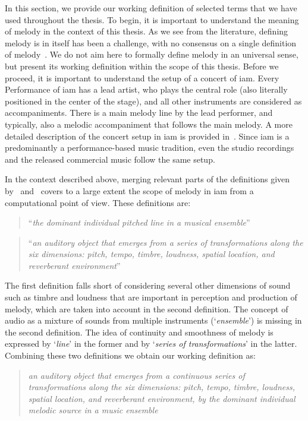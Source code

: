 In this section, we provide our working definition of selected terms that we have used throughout the thesis. To begin, it is important to understand the meaning of melody in the context of this thesis. As we see from the literature, defining melody is in itself has been a challenge, with no consensus on a single definition of melody~\citep{gomez2003melody,salamon:phd:13}. We do not aim here to formally define melody in an universal sense, but present its working definition within the scope of this thesis. Before we proceed, it is important to understand the setup of a concert of \gls{iam}. Every Performance of \gls{iam} has a lead artist, who plays the central role (also literally positioned in the center of the stage), and all other instruments are considered as accompaniments. There is a main melody line by the lead performer, and typically, also a melodic accompaniment that follows the main melody. A more detailed description of the concert setup in \gls{iam} is provided in~. Since \gls{iam} is a predominantly a performance-based music tradition, even the studio recordings and the released commercial music follow the same setup.

In the context described above, merging relevant parts of the definitions given by~\cite{paiva2006melody} and~\cite{levitin2002memory} covers to a large extent the scope of melody in \gls{iam} from a computational point of view. These definitions are:

\blockquote[\cite{paiva2006melody}]{``\textit{the dominant individual pitched line in a musical ensemble}''}

\blockquote[\cite{levitin2002memory}]{``\textit{an auditory object that emerges from a series of transformations along the six dimensions: pitch, tempo, timbre, loudness, spatial location, and reverberant environment}''}

The first definition falls short of considering several other dimensions of sound such as timbre and loudness that are important in perception and production of melody, which are taken into account in the second definition. The concept of audio as a mixture of sounds from multiple instruments (`\textit{ensemble}') is missing in the second definition. The idea of continuity and smoothness of melody is expressed by `\textit{line}' in the former and by `\textit{series of transformations}' in the latter. Combining these two definitions we obtain our working definition as: 

\blockquote{\textit{an auditory object that emerges from a continuous series of transformations along the six dimensions: pitch, tempo, timbre, loudness, spatial location, and reverberant environment, by the dominant individual melodic source in a music ensemble}}. 

